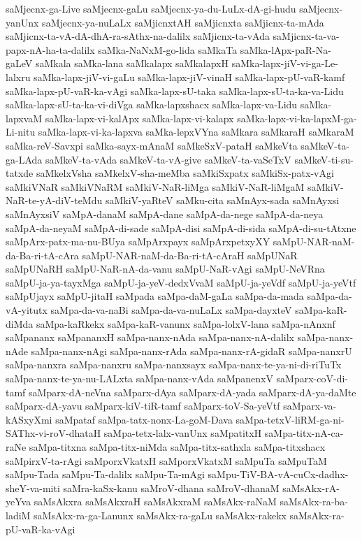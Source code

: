 {saMjecnx-ga-Live
saMjecnx-gaLu
saMjecnx-ya-du-LuLx-dA-gi-hudu
saMjecnx-yanUnx
saMjecnx-ya-nuLaLx
saMjicnxtAH
saMjicnxta
saMjicnx-ta-mAda
saMjicnx-ta-vA-dA-dhA-ra-sAthx-na-dalilx
saMjicnx-ta-vAda
saMjicnx-ta-va-papx-nA-ha-ta-dalilx
saMka-NaNxM-go-lida
saMkaTa
saMka-lApx-paR-Na-gaLeV
saMkala
saMka-lana
saMkalapx
saMkalapxH
saMka-lapx-jiV-vi-ga-Le-lalxru
saMka-lapx-jiV-vi-gaLu
saMka-lapx-jiV-vinaH
saMka-lapx-pU-vaR-kamf
saMka-lapx-pU-vaR-ka-vAgi
saMka-lapx-sU-taka
saMka-lapx-sU-ta-ka-va-Lidu
saMka-lapx-sU-ta-ka-vi-diVga
saMka-lapxshacx
saMka-lapx-va-Lidu
saMka-lapxvaM
saMka-lapx-vi-kalApx
saMka-lapx-vi-kalapx
saMka-lapx-vi-ka-lapxM-ga-Li-nitu
saMka-lapx-vi-ka-lapxva
saMka-lepxVYna
saMkara
saMkaraH
saMkaraM
saMka-reV-Savxpi
saMka-sayx-mAnaM
saMkeSxV-pataH
saMkeVta
saMkeV-ta-ga-LAda
saMkeV-ta-vAda
saMkeV-ta-vA-give
saMkeV-ta-vaSeTxV
saMkeV-ti-su-tatxde
saMkelxVsha
saMkelxV-sha-meMba
saMkiSxpatx
saMkiSx-patx-vAgi
saMkiVNaR
saMkiVNaRM
saMkiV-NaR-liMga
saMkiV-NaR-liMgaM
saMkiV-NaR-te-yA-diV-teMdu
saMkiV-yaRteV
saMku-cita
saMnAyx-sada
saMnAyxsi
saMnAyxsiV
saMpA-danaM
saMpA-dane
saMpA-da-nege
saMpA-da-neya
saMpA-da-neyaM
saMpA-di-sade
saMpA-disi
saMpA-di-sida
saMpA-di-su-tAtxne
saMpArx-patx-ma-nu-BUya
saMpArxpayx
saMpArxpetxyXY
saMpU-NAR-naM-da-Ba-ri-tA-cAra
saMpU-NAR-naM-da-Ba-ri-tA-cAraH
saMpUNaR
saMpUNaRH
saMpU-NaR-nA-da-vanu
saMpU-NaR-vAgi
saMpU-NeVRna
saMpU-ja-ya-tayxMga
saMpU-ja-yeV-dedxVvaM
saMpU-ja-yeVdf
saMpU-ja-yeVtf
saMpUjayx
saMpU-jitaH
saMpada
saMpa-daM-gaLa
saMpa-da-mada
saMpa-da-vA-yitutx
saMpa-da-va-naBi
saMpa-da-va-nuLaLx
saMpa-dayxteV
saMpa-kaR-diMda
saMpa-kaRkekx
saMpa-kaR-vanunx
saMpa-lolxV-lana
saMpa-nAnxnf
saMpananx
saMpananxH
saMpa-nanx-nAda
saMpa-nanx-nA-dalilx
saMpa-nanx-nAde
saMpa-nanx-nAgi
saMpa-nanx-rAda
saMpa-nanx-rA-gidaR
saMpa-nanxrU
saMpa-nanxra
saMpa-nanxru
saMpa-nanxsayx
saMpa-nanx-te-ya-ni-di-riTuTx
saMpa-nanx-te-ya-nu-LALxta
saMpa-nanx-vAda
saMpanenxV
saMparx-coV-di-tamf
saMparx-dA-neVna
saMparx-dAya
saMparx-dA-yada
saMparx-dA-ya-daMte
saMparx-dA-yavu
saMparx-kiV-tiR-tamf
saMparx-toV-Sa-yeVtf
saMparx-va-kASxyXmi
saMpataf
saMpa-tatx-nonx-La-goM-Dava
saMpa-tetxV-liRM-ga-ni-SAThx-vi-roV-dhataH
saMpa-tetx-lalx-vanUnx
saMpatitxH
saMpa-titx-nA-ca-raNe
saMpa-titxna
saMpa-titx-niMda
saMpa-titx-sathxla
saMpa-titxshacx
saMpirxV-ta-rAgi
saMporxVkatxH
saMporxVkatxM
saMpuTa
saMpuTaM
saMpu-Tada
saMpu-Ta-dalilx
saMpu-Ta-mAgi
saMpu-TiV-BA-vA-cuCx-dadhx-sheY-va-miti
saMra-kaSx-kanu
saMroV-dhana
saMroV-dhanaM
saMsAkx-rA-yeYva
saMsAkxra
saMsAkxraH
saMsAkxraM
saMsAkx-raNaM
saMsAkx-ra-ba-ladiM
saMsAkx-ra-ga-Lanunx
saMsAkx-ra-gaLu
saMsAkx-rakekx
saMsAkx-ra-pU-vaR-ka-vAgi
}
